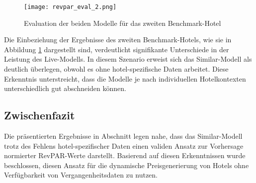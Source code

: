 \begin{figure}[h]
    \centering
    \texttt{[image: revpar\_eval\_2.png]}
    \caption[Evaluation der beiden Modelle für das zweiten Benchmark-Hotel]{Evaluation der beiden Modelle für das zweiten Benchmark-Hotel}
    \label{img:revpar_eval_2}
\end{figure}

Die Einbeziehung der Ergebnisse des zweiten Benchmark-Hotels, wie sie in Abbildung \ref{img:revpar_eval_2} dargestellt sind, verdeutlicht signifikante Unterschiede in der Leistung des Live-Modells. In diesem Szenario erweist sich das Similar-Modell als deutlich überlegen, obwohl es ohne hotel-spezifische Daten arbeitet. Diese Erkenntnis unterstreicht, dass die Modelle je nach individuellen Hotelkontexten unterschiedlich gut abschneiden können.

\subsection{Zwischenfazit}
\label{subsec:revpar_fazit}
Die präsentierten Ergebnisse in Abschnitt \emph{} legen nahe, dass das Similar-Modell trotz des Fehlens hotel-spezifischer Daten einen validen Ansatz zur Vorhersage normierter RevPAR-Werte darstellt. Basierend auf diesen Erkenntnissen wurde beschlossen, diesen Ansatz für die dynamische Preisgenerierung von Hotels ohne Verfügbarkeit von Vergangenheitsdaten zu nutzen.

